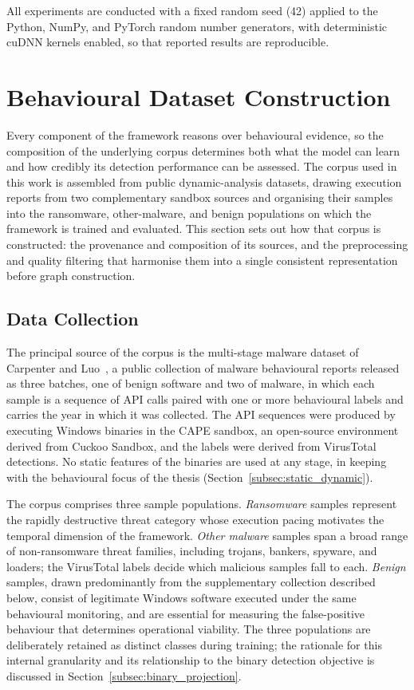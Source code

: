 \documentclass[%
    BCOR=10mm,
    DIV=13,
    toc=bibliography,
    toc=listof,
    oneside,
    12pt,
]{scrbook}
\begin{document}
All experiments are conducted with a fixed random seed (42) applied to the
Python, NumPy, and PyTorch random number generators, with deterministic cuDNN
kernels enabled, so that reported results are reproducible.

\section{Behavioural Dataset Construction}
\label{sec:dataset}

Every component of the framework reasons over behavioural evidence, so the
composition of the underlying corpus determines both what the model can learn
and how credibly its detection performance can be assessed. The corpus used in
this work is assembled from public dynamic-analysis datasets, drawing execution
reports from two complementary sandbox sources and organising their samples
into the ransomware, other-malware, and benign populations on which the
framework is trained and evaluated. This section sets out how that corpus is
constructed: the provenance and composition of its sources, and the
preprocessing and quality filtering that harmonise them into a single consistent
representation before graph construction.

\subsection{Data Collection}
\label{subsec:data_collection}

The principal source of the corpus is the multi-stage malware dataset of
Carpenter and Luo~\cite{carpenter2023}, a public collection of malware
behavioural reports released as three batches, one of benign software and two
of malware, in which each sample is a sequence of API calls paired with one or
more behavioural labels and carries the year in which it was collected. The API
sequences were produced by executing Windows binaries in the CAPE sandbox, an
open-source environment derived from Cuckoo Sandbox, and the labels were
derived from VirusTotal detections. No static
features of the binaries are used at any stage, in keeping with the behavioural
focus of the thesis (Section~\ref{subsec:static_dynamic}).

The corpus comprises three sample populations. \emph{Ransomware} samples
represent the rapidly destructive threat category whose execution pacing
motivates the temporal dimension of the framework. \emph{Other malware}
samples span a broad range of non-ransomware threat families, including
trojans, bankers, spyware, and loaders; the VirusTotal labels decide which
malicious samples fall to each. \emph{Benign} samples, drawn predominantly
from the supplementary collection described below, consist of legitimate
Windows software executed under the same behavioural monitoring, and are
essential for measuring the false-positive behaviour that determines
operational viability. The three populations are deliberately retained as
distinct classes during training; the rationale for this internal granularity
and its relationship to the binary detection objective is discussed in
Section~\ref{subsec:binary_projection}.
\end{document}
